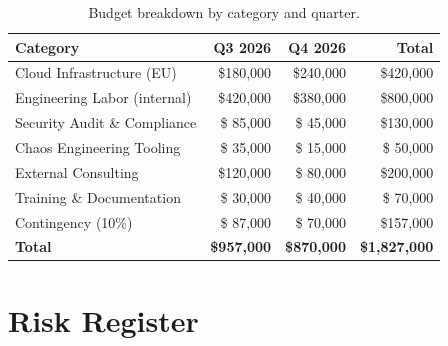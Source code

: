 \documentclass[
    language=english,
    doctype=project-charter,
    institution=none,
]{../../omnilatex}
\begin{document}
\begin{table}[h]
    \centering
    \begin{tabular}{lrrr}
        \toprule
        \textbf{Category} & \textbf{Q3 2026} & \textbf{Q4 2026} & \textbf{Total} \\
        \midrule
        Cloud Infrastructure (EU)     & \$180,000 & \$240,000 & \$420,000 \\
        Engineering Labor (internal)  & \$420,000 & \$380,000 & \$800,000 \\
        Security Audit \& Compliance  & \$ 85,000 & \$ 45,000 & \$130,000 \\
        Chaos Engineering Tooling     & \$ 35,000 & \$ 15,000 & \$ 50,000 \\
        External Consulting           & \$120,000 & \$ 80,000 & \$200,000 \\
        Training \& Documentation     & \$ 30,000 & \$ 40,000 & \$ 70,000 \\
        Contingency (10\%)            & \$ 87,000 & \$ 70,000 & \$157,000 \\
        \midrule
        \textbf{Total}                & \textbf{\$957,000} & \textbf{\$870,000} & \textbf{\$1,827,000} \\
        \bottomrule
    \end{tabular}
    \caption{Budget breakdown by category and quarter.}
\end{table}

\section{Risk Register}
\end{document}
